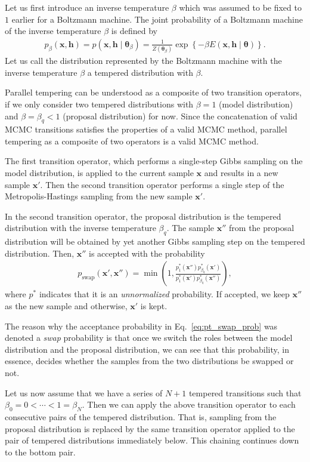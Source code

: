 \documentclass{now}
\newcommand{\vect}[1]{\mathbf{#1}}
\newcommand{\vects}[1]{\boldsymbol{#1}}
\newcommand{\vh}[0]{\vect{h}}
\newcommand{\vx}[0]{\vect{x}}
\newcommand{\TT}[0]{{\vects{\theta}}}
\begin{document}
Let us first introduce an inverse temperature $\beta$ which was assumed to be
fixed to $1$ earlier for a Boltzmann machine. The joint probability of a
Boltzmann machine of the inverse temperature $\beta$ is defined by
\begin{align*}
    p_{\beta} (\vx, \vh) = p (\vx, \vh \mid \TT_\beta) =
    \frac{1}{Z(\TT_\beta)} \exp\left\{ -\beta E(\vx, \vh
    \mid \TT) \right\}.
\end{align*}
Let us call the distribution represented by the Boltzmann machine with the
inverse temperature $\beta$ a tempered distribution with $\beta$.

Parallel tempering can be understood as a composite of two transition operators,
if we only consider two tempered distributions with $\beta=1$ (model
distribution) and $\beta = \beta_q < 1$ (proposal distribution) for now.  Since
the concatenation of valid MCMC transitions satisfies the properties of a valid
MCMC method, parallel tempering as a composite of two operators is a valid MCMC
method.

The first transition operator, which performs a single-step Gibbs sampling on
the model distribution, is applied to the current sample $\vx$ and results in a
new sample $\vx'$.  Then the second transition operator performs a single step
of the Metropolis-Hastings sampling from the new sample $\vx'$.

In the second transition operator, the proposal distribution is the tempered
distribution with the inverse temperature $\beta_q$. The sample $\vx''$ from the
proposal distribution will be obtained by yet another Gibbs sampling step on the
tempered distribution. Then, $\vx''$ is accepted with the probability
\begin{align}
    \label{eq:pt_swap_prob}
    p_\text{swap} (\vx', \vx'') = \min \left( 1, \frac{p_1^*
    (\vx'') p^*_{\beta_q} (\vx')}{p^*_1(\vx')
    p^*_{\beta_q}(\vx'')}
    \right),
\end{align}
where $p^*$ indicates that it is an \textit{unnormalized} probability. If
accepted, we keep $\vx''$ as the new sample and otherwise, $\vx'$ is kept.

The reason why the acceptance probability in Eq.~\eqref{eq:pt_swap_prob} was
denoted a \textit{swap} probability is that once we switch the roles between the
model distribution and the proposal distribution, we can see that this
probability, in essence, decides whether the samples from the two distributions
be swapped or not.

Let us now assume that we have a series of $N+1$ tempered transitions such that
$\beta_0=0 < \cdots < 1 = \beta_N$.  Then we can apply the above transition
operator to each consecutive pairs of the tempered distribution. That is,
sampling from the proposal distribution is replaced by the same transition
operator applied to the pair of tempered distributions immediately below. This
chaining continues down to the bottom pair.
\end{document}
